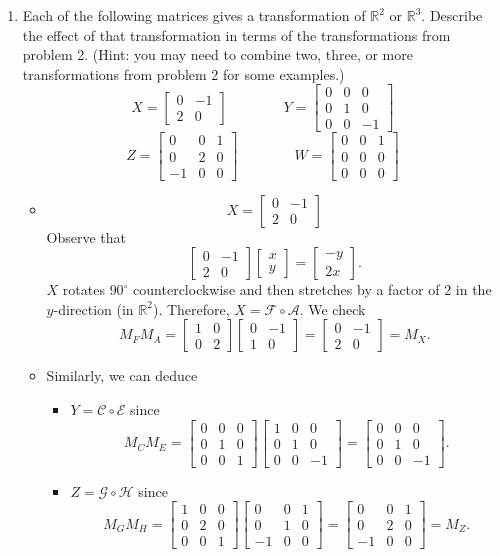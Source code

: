 \documentclass[letter]{article}
\newcommand{\R}{\mathbb{R}}
\newcommand{\mat}[1]{\begin{bmatrix}#1\end{bmatrix}}
\newenvironment{answer}{
	\begin{adjustwidth}{8mm}{} \vspace{2mm}}{\end{adjustwidth} \vspace{2mm}
}
\theoremstyle{plain}
\theoremstyle{definition}
\theoremstyle{remark}
\begin{document}
\begin{enumerate}
		
		\item Each of the following matrices gives a transformation of $\R^2$ or $\R^3$.  
			Describe the effect of that transformation in terms of the transformations from problem 2.
			(Hint: you may need to combine two, three, or more transformations from problem 2 for some
			examples.)
			\[
				X=\mat{0 & -1 \\ 2 & 0}
				\qquad \qquad
				Y=\mat{0 & 0 & 0\\ 0 & 1 & 0 \\ 0 & 0 & -1}
			\]
			\[
				Z=\mat{0 & 0 & 1 \\ 0 & 2 & 0 \\ -1 & 0 & 0}
				\qquad\qquad
				W=\mat{0 & 0 & 1 \\ 0 & 0 & 0 \\ 0 & 0 & 0}
			\]
		\begin{answer}
			\begin{itemize}
				\item
				\[
				X = \mat{0 & -1 \\ 2 & 0}
				\]
				Observe that
				\[
				\mat{0 & -1 \\ 2 & 0}\mat{x\\y} = \mat{-y\\2x}.
				\]
				$X$ rotates $90^\circ$ counterclockwise and then stretches by a factor of $2$ in the $y$-direction (in $\R^2$). Therefore, $X = \mathcal{F} \circ \mathcal{A}$. We check
				\[
				M_F M_A = \mat{1&0\\0&2}\mat{0&-1\\1&0} = \mat{0&-1\\2&0} = M_X.
				\]
				\item Similarly, we can deduce
				\begin{itemize}
					\item $Y = \mathcal{C} \circ \mathcal{E}$ since
					\[
					M_C M_E = \mat{0&0&0\\0&1&0\\0&0&1}\mat{1&0&0\\0&1&0\\0&0&-1} = \mat{0&0&0\\0&1&0\\0&0&-1}.
					\]
					\item $Z = \mathcal{G} \circ \mathcal{H}$ since
					\[
					M_G M_H = \mat{1&0&0\\0&2&0\\0&0&1}\mat{0&0&1\\0&1&0\\-1&0&0} = \mat{0&0&1\\0&2&0\\-1&0&0} = M_Z.
\]
\end{itemize}
\end{itemize}
\end{answer}
\end{enumerate}
\end{document}
